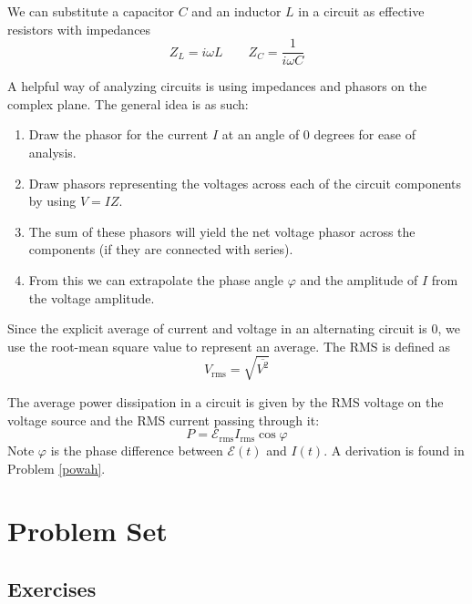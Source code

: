 \documentclass[11pt]{scrartcl}
\begin{document}
\begin{theorem}[Impedance]
    We can substitute a capacitor $C$ and an inductor $L$ in a circuit as effective resistors with impedances $$Z_L=i\omega L\qquad Z_C=\frac{1}{i\omega C}$$
\end{theorem}

\begin{idea}[Phasors]
    A helpful way of analyzing circuits is using impedances and phasors on the complex plane. The general idea is as such: \begin{enumerate}
        \item Draw the phasor for the current $I$ at an angle of 0 degrees for ease of analysis.
        \item Draw phasors representing the voltages across each of the circuit components by using $V=IZ$. 
        \item The sum of these phasors will yield the net voltage phasor across the components (if they are connected with series).
        \item From this we can extrapolate the phase angle $\varphi$ and the amplitude of $I$ from the voltage amplitude. 
    \end{enumerate}
\end{idea}

\begin{defn}[RMS]
Since the explicit average of current and voltage in an alternating circuit is 0, we use the root-mean square value to represent an average. The RMS is defined as $$V_{\text{rms}}=\sqrt{\overline{V^2}}$$
\end{defn}

\begin{theorem}[Power]
    The average power dissipation in a circuit is given by the RMS voltage on the voltage source and the RMS current passing through it: $$P=\mathcal E_{\text{rms}}I_{\text{rms}}\cos\varphi$$Note $\varphi$ is the phase difference between $\mathcal E(t)$ and $I(t)$. A derivation is found in Problem \ref{powah}.
\end{theorem}
\section{Problem Set}

\subsection{Exercises}
\end{document}

